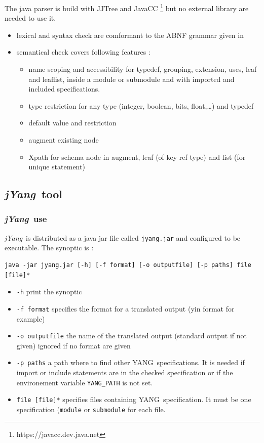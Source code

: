 \documentclass[a4paper]{article}
\newcommand{\jyang}{{\sl jYang}}
\newcommand{\y}{YANG}
\begin{document}
The    java    parser    is    build   with    JJTree    and    JavaCC
\footnote{https://javacc.dev.java.net}  but  no  external library  are
needed to use it.

\begin{itemize}
\item
lexical and syntax  check are comformant to the  ABNF grammar given in
\cite{yang01}
\item
semantical check covers following features :
\begin{itemize}
\item
name scoping and accessibility for typedef, grouping, extension, uses,
leaf and  leaflist, inside  a module  or submodule  and with  imported and
included specifications.
\item
type restriction  for any type (integer,  boolean, bits, float,\ldots)
and typedef
\item
default value and restriction
\item
augment existing node
\item
Xpath for schema node in augment, leaf (of key ref type) and list (for
unique statement)
\end{itemize}
\end{itemize}

\subsection{\jyang\ tool}

\subsubsection{\jyang\ use}

\jyang\ is distributed  as a java jar file  called {\tt jyang.jar} and
configured to be executable. The synoptic is :

\begin{verbatim}
java -jar jyang.jar [-h] [-f format] [-o outputfile] [-p paths] file [file]*
\end{verbatim}

\begin{itemize}
\item
{\tt -h} print the synoptic
\item
{\tt  -f format}  specifies the  format for  a translated  output (yin
format for example)
\item
{\tt -o outputfile} the name of the translated output (standard output
if not given) ignored if no format are given
\item
{\tt -p  paths} a path where  to find other \y\  specifications. It is
needed   if  import  or   include  statements   are  in   the  checked
specification or  if the environement variable {\tt  YANG\_PATH} is not
set.
\item
{\tt file [file]*} specifies files containing \y\ specification. It must be one specification ({\tt module} or {\tt submodule} for each file.
\end{itemize}
\end{document}
